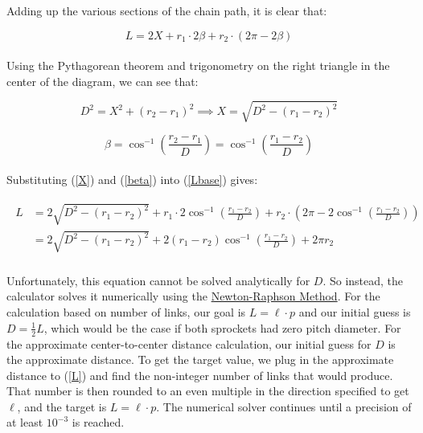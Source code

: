 \documentclass[a4paper]{article}
\begin{document}
	Adding up the various sections of the chain path, it is clear that:
	
	\begin{equation} \label{Lbase}
		L = 2X + r_1 \cdot 2\beta + r_2 \cdot \left( 2\pi - 2\beta \right)
	\end{equation}\\
	
	Using the Pythagorean theorem and trigonometry on the right triangle in the center of the diagram, we can see that:
	
	\begin{equation} \label{X}
		D^2 = X^2 + \left( r_2 - r_1 \right)^2 \implies X = \sqrt{D^2 - \left( r_1 - r_2 \right)^2}
	\end{equation}
	
	\begin{equation} \label{beta}
		\beta = \cos^{-1} \left( \frac{r_2 - r_1}{D} \right) = \cos^{-1} \left( \frac{r_1 - r_2}{D} \right)
	\end{equation}\\
	
	Substituting (\ref{X}) and (\ref{beta}) into (\ref{Lbase}) gives:
	
	\begin{gather} \label{L}
	\begin{aligned}
		L &= 2 \sqrt{D^2 - (r_1 - r_2)^2} + r_1 \cdot 2 \cos^{-1} \left( \frac{r_1 - r_2}{D} \right) + r_2 \cdot \left( 2\pi - 2\cos^{-1} \left( \frac{r_1 - r_2}{D} \right) \right) \\
		&= 2 \sqrt{D^2 - \left( r_1 - r_2 \right)^2} + 2 \left( r_1 - r_2 \right) \cos^{-1} \left( \frac{r_1 - r_2}{D} \right) + 2\pi r_2
	\end{aligned}
	\end{gather}\\
	
	Unfortunately, this equation cannot be solved analytically for $ D $. So instead, the calculator solves it numerically using the \href{https://en.wikipedia.org/wiki/Newton\%27s_method}{Newton-Raphson Method}. For the calculation based on number of links, our goal is $ L = \ell \cdot p $ and our initial guess is $ D = \frac{1}{2} L $, which would be the case if both sprockets had zero pitch diameter. For the approximate center-to-center distance calculation, our initial guess for $ D $ is the approximate distance. To get the target value, we plug in the approximate distance to (\ref{L}) and find the non-integer number of links that would produce. That number is then rounded to an even multiple in the direction specified to get $ \ell $, and the target is $ L = \ell \cdot p $. The numerical solver continues until a precision of at least $ 10^{-3} $ is reached.
	
	
\end{document}
